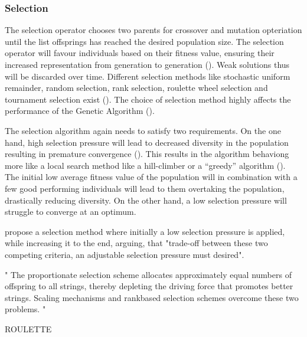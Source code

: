 \subsubsection{Selection}
The selection operator chooses two parents for crossover and mutation opteriation until the list offsprings has reached the desired population size. 
The selection operator will favour individuals based on their fitness value, ensuring their increased representation from generation to generation (\cite{srinivas_genetic_1994}). Weak solutions thus will be discarded over time.
Different selection methods like stochastic uniform remainder, random selection, rank selection, roulette wheel selection and tournament selection exist (\cite{majumdar_genetic_2015}). The choice of selection method highly affects the performance of the Genetic Algorithm (\cite{hussain_trade-off_2020}).

The selection algorithm again needs to satisfy two requirements. On the one hand, high selection pressure will lead to decreased diversity in the population resulting in premature convergence (\cite{katoch_review_2021}). This results in the algorithm behaviong more like a local search method like a hill-climber or a “greedy” algorithm (\cite{kacprzyk_parameter_2007}).
The initial low average fitness value of the population will in combination with a few good performing individuals will lead to them overtaking the population, drastically reducing diversity.
On the other hand, a low selection pressure will struggle to converge at an optimum.

\cite{hussain_trade-off_2020} propose a selection method where initially a low selection pressure is applied, while increasing it to the end, arguing, that "trade-off between these two competing criteria, an adjustable selection pressure must desired".








"
The proportionate selection scheme allocates approximately equal numbers of offspring to all strings, thereby depleting the driving force that promotes better strings. Scaling mechanisms and rankbased selection schemes overcome these two problems.
"\cite{srinivas_genetic_1994}



ROULETTE


